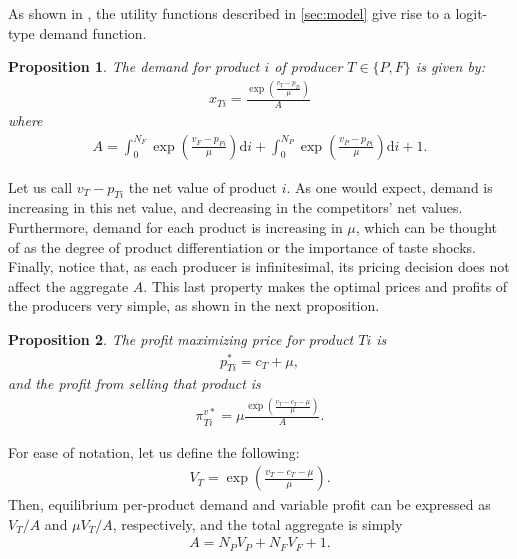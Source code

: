 \documentclass[a4paper]{article}
\newtheorem{proposition}{Proposition}
\newcommand{\di}{\mathrm{d}i}
\begin{document}
As shown in \textcite[]{anderson2021hybrid}, the utility functions described in \cref{sec:model} give rise to a logit-type demand function.
\begin{proposition}
    \label{prop:demand_function}
    The demand for product $i$ of producer $T \in \{P, F\}$ is given by:
    \begin{align*}
        x_{Ti} = \frac{\exp\left( \frac{v_T - p_{Ti}}{\mu} \right)}{A}
    \end{align*}
    where
    \begin{align}
        A = \int_0^{N_F} \exp\left( \frac{v_F - p_{Fi}}{\mu} \right) \di + \int_0^{N_P} \exp\left( \frac{v_P - p_{Pi}}{\mu} \right) \di + 1.
        \label{eq:aggregate}
    \end{align}
\end{proposition}

Let us call $v_T - p_{Ti}$ the net value of product $i$.
As one would expect, demand is increasing in this net value, and decreasing in the competitors' net values.
Furthermore, demand for each product is increasing in $\mu$, which can be thought of as the degree of product differentiation or the importance of taste shocks.
Finally, notice that, as each producer is infinitesimal, its pricing decision does not affect the aggregate $A$.
This last property makes the optimal prices and profits of the producers very simple, as shown in the next proposition.
\begin{proposition}
    \label{prop:optimal_profit}
    The profit maximizing price for product $Ti$ is
    \begin{align*}
        p^*_{Ti} = c_T + \mu,
    \end{align*}
    and the profit from selling that product is
    \begin{align}
        \pi^{v*}_{Ti} = \mu \frac{\exp \left( \frac{v_T - c_T - \mu}{\mu} \right)}{A}.
        \label{eq:optimal_profit}
    \end{align}
\end{proposition}

For ease of notation, let us define the following:
\begin{align*}
    V_T = \exp \left( \frac{v_T - c_T - \mu}{\mu} \right).
\end{align*}
Then, equilibrium per-product demand and variable profit can be expressed as $V_T/ A$ and $\mu V_T/ A$, respectively, and the total aggregate is simply
\begin{align*}
    A = N_P V_P + N_F V_F + 1.
\end{align*}
\end{document}
